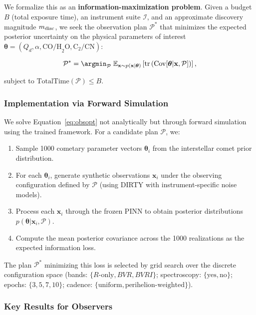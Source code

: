 \documentclass[usenatbib]{mnras}
\begin{document}
We formalize this as an \textbf{information-maximization problem}. Given a budget $B$ (total exposure time), an instrument suite $\mathcal{I}$, and an approximate discovery magnitude $m_{\rm disc}$, we seek the observation plan $\mathcal{P}^*$ that minimizes the expected posterior uncertainty on the physical parameters of interest $\boldsymbol{\theta} = (Q_d, \alpha, \text{CO/H}_2\text{O}, \text{C}_2/\text{CN})$:

\begin{equation}\label{eq:obsopt}
\mathcal{P}^* = \argmin_{\mathcal{P}} \; \mathbb{E}_{\mathbf{x} \sim p(\mathbf{x}|\boldsymbol{\theta})}\left[\text{tr}\left(\text{Cov}[\boldsymbol{\theta} | \mathbf{x}, \mathcal{P}]\right)\right],
\end{equation}

subject to $\text{TotalTime}(\mathcal{P}) \leq B$.

\subsubsection{Implementation via Forward Simulation}

We solve Equation~\ref{eq:obsopt} not analytically but through forward simulation using the trained framework. For a candidate plan $\mathcal{P}$, we:

\begin{enumerate}
    \item Sample 1000 cometary parameter vectors $\boldsymbol{\theta}_i$ from the interstellar comet prior distribution.
    \item For each $\boldsymbol{\theta}_i$, generate synthetic observations $\mathbf{x}_i$ under the observing configuration defined by $\mathcal{P}$ (using DIRTY with instrument-specific noise models).
    \item Process each $\mathbf{x}_i$ through the frozen PINN to obtain posterior distributions $p(\boldsymbol{\theta} | \mathbf{x}_i, \mathcal{P})$.
    \item Compute the mean posterior covariance across the 1000 realizations as the expected information loss.
\end{enumerate}

The plan $\mathcal{P}^*$ minimizing this loss is selected by grid search over the discrete configuration space (bands: $\{R\text{-only}, BVR, BVRI\}$; spectroscopy: $\{\text{yes}, \text{no}\}$; epochs: $\{3, 5, 7, 10\}$; cadence: $\{\text{uniform}, \text{perihelion-weighted}\}$).

\subsubsection{Key Results for Observers}
\end{document}
